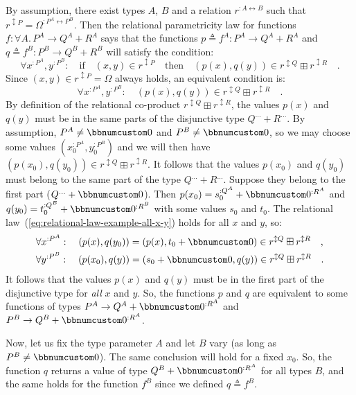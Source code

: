 By assumption, there exist types $A$, $B$ and a relation $r^{:A\leftrightarrow B}$
such that $r^{\updownarrow P}=\Omega^{:P^{A}\leftrightarrow P^{B}}$.
Then the relational parametricity law for functions $f:\forall A.\,P^{A}\rightarrow Q^{A}+R^{A}$
says that the functions $p\triangleq f^{A}:P^{A}\rightarrow Q^{A}+R^{A}$
and $q\triangleq f^{B}:P^{B}\rightarrow Q^{B}+R^{B}$ will satisfy
the condition:
\[
\forall x^{:P^{A}},y^{:P^{B}}:\quad\text{if}\quad(x,y)\in r^{\updownarrow P}\quad\text{then}\quad(p(x),q(y))\in r^{\updownarrow Q}\boxplus r^{\updownarrow R}\quad.
\]
Since $(x,y)\in r^{\updownarrow P}=\Omega$ always holds, an equivalent
condition is:
\begin{equation}
\forall x^{:P^{A}},y^{:P^{B}}:\quad(p(x),q(y))\in r^{\updownarrow Q}\boxplus r^{\updownarrow R}\quad.\label{eq:relational-law-example-all-x-y}
\end{equation}
By definition of the relational co-product $r^{\updownarrow Q}\boxplus r^{\updownarrow R}$,
the values $p(x)$ and $q(y)$ must be in the same parts of the disjunctive
type $Q^{...}+R^{...}$. By assumption, $P^{A}\neq\bbnum 0$ and $P^{B}\neq\bbnum 0$,
so we may choose some values $(x_{0}^{:P^{A}},y_{0}^{:P^{B}})$ and
we will then have $\left(p(x_{0}),q(y_{0})\right)\in r^{\updownarrow Q}\boxplus r^{\updownarrow R}$.
It follows that the values $p(x_{0})$ and $q(y_{0})$ must belong
to the same part of the type $Q^{...}+R^{...}$. Suppose they belong
to the first part ($Q^{...}+\bbnum 0$). Then $p(x_{0})=s_{0}^{:Q^{A}}+\bbnum 0^{:R^{A}}$
and $q(y_{0})=t_{0}^{:Q^{B}}+\bbnum 0^{:R^{B}}$ with some values
$s_{0}$ and $t_{0}$. The relational law~(\ref{eq:relational-law-example-all-x-y})
holds for all $x$ and $y$, so: 
\begin{align*}
 & \forall x^{:P^{A}}:\quad(p(x),q(y_{0}))=(p(x),t_{0}+\bbnum 0)\in r^{\updownarrow Q}\boxplus r^{\updownarrow R}\quad,\\
 & \forall y^{:P^{B}}:\quad(p(x_{0}),q(y))=(s_{0}+\bbnum 0,q(y))\in r^{\updownarrow Q}\boxplus r^{\updownarrow R}\quad.
\end{align*}
It follows that the values $p(x)$ and $q(y)$ must be in the first
part of the disjunctive type for \emph{all} $x$ and $y$. So, the
functions $p$ and $q$ are equivalent to some functions of types
$P^{A}\rightarrow Q^{A}+\bbnum 0^{:R^{A}}$ and $P^{B}\rightarrow Q^{B}+\bbnum 0^{:R^{A}}$.

Now, let us fix the type parameter $A$ and let $B$ vary (as long
as $P^{B}\neq\bbnum 0$). The same conclusion will hold for a fixed
$x_{0}$. So, the function $q$ returns a value of type $Q^{B}+\bbnum 0^{:R^{A}}$
for all types $B$, and the same holds for the function $f^{B}$ since
we defined $q\triangleq f^{B}$.

